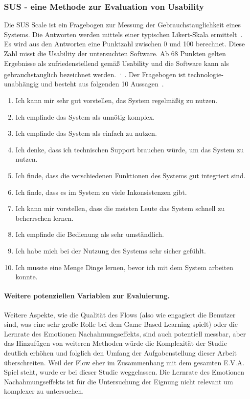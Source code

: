 \subsubsection{SUS - eine Methode zur Evaluation von Usability}
Die SUS Scale ist ein Fragebogen zur Messung der Gebrauchstauglichkeit eines Systems.  Die Antworten werden mittels einer typischen Likert-Skala ermittelt~\cite{ Jordan1996}. Es wird aus den Antworten eine Punktzahl zwischen 0 und 100 berechnet. Diese Zahl misst die Usability der untersuchten Software. Ab 68 Punkten gelten Ergebnisse als zufriedenstellend gemäß Usability und die Software kann als gebrauchstauglich bezeichnet werden.~\cite{SUS}\textsuperscript{,}~\cite{ Jordan1996}. Der Fragebogen ist technologie-unabhängig und besteht aus folgenden 10 Aussagen~\cite{SUS_online}.
\begin{enumerate}
    \item Ich kann mir sehr gut vorstellen, das System regelmäßig zu nutzen.
    \item Ich empfinde das System als unnötig komplex.
    \item Ich empfinde das System als einfach zu nutzen.
    \item Ich denke, dass ich technischen Support brauchen würde, um das System zu nutzen.
    \item Ich finde, dass die verschiedenen Funktionen des Systems gut integriert sind.
    \item Ich finde, dass es im System zu viele Inkonsistenzen gibt.
    \item Ich kann mir vorstellen, dass die meisten Leute das System schnell zu beherrschen lernen.
    \item Ich empfinde die Bedienung als sehr umständlich.
    \item Ich habe mich bei der Nutzung des Systems sehr sicher gefühlt.
    \item Ich musste eine Menge Dinge lernen, bevor ich mit dem System arbeiten konnte.
\end{enumerate}

\paragraph{Weitere potenziellen Variablen zur Evaluierung.}Weitere Aspekte, wie die Qualität des Flows (also wie engagiert die Benutzer sind, was eine sehr große Rolle bei dem Game-Based Learning spielt) oder die Lernrate des Emotionen Nachahmungseffekts, sind auch potentiell messbar, aber das Hinzufügen von weiteren Methoden würde die Komplexität der Studie deutlich erhöhen und folglich den Umfang der Aufgabenstellung dieser Arbeit überschreiten. Weil der Flow eher im Zusammenhang mit dem gesamten E.V.A. Spiel steht, wurde er bei dieser Studie weggelassen. Die Lernrate des Emotionen Nachahmungseffekts ist für die Untersuchung der Eignung nicht relevant um komplexer zu untersuchen.

